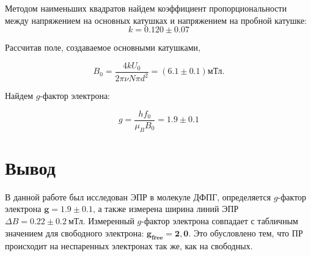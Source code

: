 \documentclass[a4paper, 12pt]{article}
\begin{document}
        Методом наименьших квадратов найдем коэффициент пропорциональности между напряжением на основных катушках и напряжением на пробной катушке:
        \begin{equation*}
            k = 0.120 \pm 0.07
        \end{equation*}
		
		Рассчитав поле, создаваемое основными катушками,
		
		\begin{equation*}
		    B_0 = \frac{4 k U_0}{2\pi\nu N \pi d^2} = (6.1 \pm 0.1) \text{мТл}.
		\end{equation*}
		
		Найдем $g$-фактор электрона:
		
		\begin{equation*}
			g = \frac{hf_0}{\mu_BB_0} = 1.9 \pm 0.1
		\end{equation*}
		

\section*{Вывод}
	В данной работе был исследован ЭПР в молекуле ДФПГ, определяется $g$-фактор электрона $\pmb{g = 1.9 \pm 0.1}$, а также измерена ширина линий ЭПР $\Delta B = 0.22 \pm 0.2~\text{мТл}$. 
	Измеренный $g$-фактор электрона совпадает с табличным значением для свободного электрона: $\pmb{g_{free} = 2,0}$. Это обусловлено тем, что ПР происходит на неспаренных электронах так же, как на свободных.
	
\end{document}
